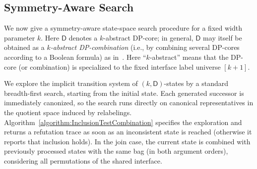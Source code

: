 \documentclass[11pt,a4paper]{article}
\newcommand{\treewidthvalue}{k}
\newcommand{\abag}{\mathfrak{b}}
\newcommand{\jointype}{\mathtt{Join}}
\newcommand{\dpcore}{\mathsf{D}}
\newcommand{\witnessset}{S}
\newcommand{\relabelingfunction}{f}
\newcommand{\relabelclass}{\mathcal{F}}
\newcommand{\action}{\rho}
\newcommand{\canonic}{\mathrm{CAN}}
\begin{document}

\subsection{Symmetry-Aware Search}\label{subsec:symmetry-search}

We now give a symmetry-aware state-space search procedure for a fixed width parameter $\treewidthvalue$.
Here $\dpcore$ denotes a $\treewidthvalue$-abstract DP-core; in general, $\dpcore$ may itself be obtained as a \emph{$\treewidthvalue$-abstract DP-combination} (i.e., by combining several DP-cores according to a Boolean formula) as in~\cite{de2023width}.
Here ``$\treewidthvalue$-abstract'' means that the DP-core (or combination) is specialized to the fixed interface label universe $[\treewidthvalue+1]$.

We explore the implicit transition system of $(\treewidthvalue,\dpcore)$-states by a standard breadth-first search, starting from the initial state.
Each generated successor is immediately canonized, so the search runs directly on canonical representatives in the quotient space induced by relabelings.
Algorithm~\ref{algorithm:InclusionTestCombination} specifies the exploration and returns a refutation trace as soon as an inconsistent state is reached (otherwise it reports that inclusion holds).
In the join case, the current state is combined with previously processed states with the same bag (in both argument orders), considering all permutations of the shared interface.
\end{document}
